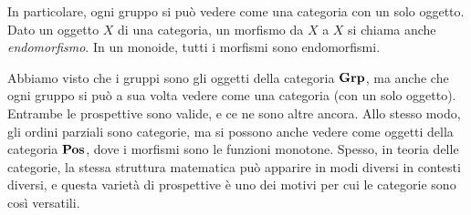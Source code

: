 In particolare, ogni gruppo si può vedere come una categoria con un solo oggetto.
Dato un oggetto $X$ di una categoria, un morfismo da $X$ a $X$ si chiama anche \emph{endomorfismo}. In un monoide, tutti i morfismi sono endomorfismi.

\begin{remark}
 Abbiamo visto che i gruppi sono gli oggetti della categoria $\mathbf{Grp}$, ma anche che ogni gruppo si può a sua volta vedere come una categoria (con un solo oggetto). Entrambe le prospettive sono valide, e ce ne sono altre ancora.
 Allo stesso modo, gli ordini parziali sono categorie, ma si possono anche vedere come oggetti della categoria $\mathbf{Pos}$, dove i morfismi sono le funzioni monotone.
 Spesso, in teoria delle categorie, la stessa struttura matematica può apparire in modi diversi in contesti diversi, e questa varietà di prospettive è uno dei motivi per cui le categorie sono così versatili.
\end{remark}







